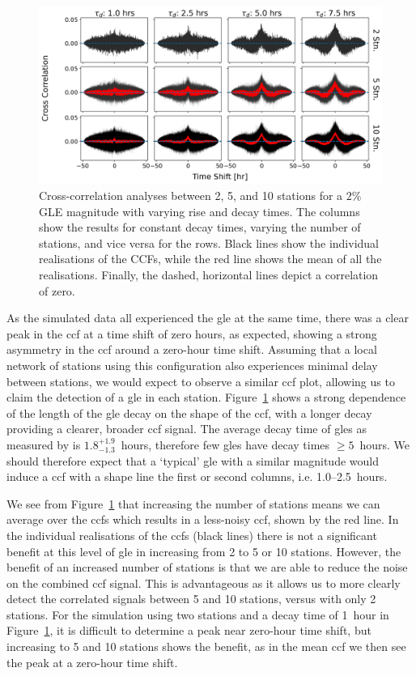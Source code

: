 \begin{figure}[ht!]
	\centering
	\includegraphics[width=\columnwidth]{HS_14008_sims_CCF_2pc_plot.png}
	\caption{Cross-correlation analyses between 2, 5, and 10 stations for a $2\%$ GLE magnitude with varying rise and decay times. The columns show the results for constant decay times, varying the number of stations, and vice versa for the rows. Black lines show the individual realisations of the CCFs, while the red line shows the mean of all the realisations. Finally, the dashed, horizontal lines depict a correlation of zero.}
	\label{fig:HS_14008_2pc_sim_CCFs}
\end{figure}

As the simulated data all experienced the \gls{gle} at the same time, there was a clear peak in the \gls{ccf} at a time shift of zero hours, as expected, showing a strong asymmetry in the \gls{ccf} around a zero-hour time shift. Assuming that a local network of stations using this configuration also experiences minimal delay between stations, we would expect to observe a similar \gls{ccf} plot, allowing us to claim the detection of a \gls{gle} in each station. Figure~\ref{fig:HS_14008_2pc_sim_CCFs} shows a strong dependence of the length of the \gls{gle} decay on the shape of the \gls{ccf}, with a longer decay providing a clearer, broader \gls{ccf} signal. The average decay time of \glspl{gle} as measured by \citet{strauss_pulse_2017} is $1.8^{+1.9}_{-1.3}$~hours, therefore few \glspl{gle} have decay times $\geq 5$~hours. We should therefore expect that a `typical' \gls{gle} with a similar magnitude would induce a \gls{ccf} with a shape line the first or second columns, i.e. 1.0--2.5~hours. 

We see from Figure~\ref{fig:HS_14008_2pc_sim_CCFs} that increasing the number of stations means we can average over the \glspl{ccf} which results in a less-noisy \gls{ccf}, shown by the red line. In the individual realisations of the \glspl{ccf} (black lines) there is not a significant benefit at this level of \gls{gle} in increasing from 2 to 5 or 10 stations. However, the benefit of an increased number of stations is that we are able to reduce the noise on the combined \gls{ccf} signal. This is advantageous as it allows us to more clearly detect the correlated signals between 5 and 10 stations, versus with only 2 stations. For the simulation using two stations and a decay time of 1~hour in Figure~\ref{fig:HS_14008_2pc_sim_CCFs}, it is difficult to determine a peak near zero-hour time shift, but increasing to 5 and 10 stations shows the benefit, as in the mean \gls{ccf} we then see the peak at a zero-hour time shift. 

